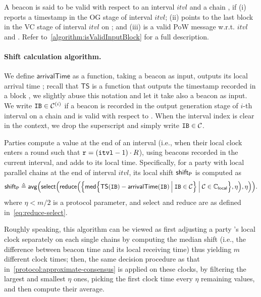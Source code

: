 A beacon  is said to be valid with respect to an interval $itvl$ and a chain \chain, if (i)  reports a timestamp in the \textsf{OG} stage of interval $itvl$; (ii)  points to the last block in the \textsf{VC} stage of interval $itvl$ on \chain; and (iii)  is a valid PoW message w.r.t. $itvl$ and \chain.
%
Refer to~\cref{algorithm:isValidInputBlock} for a full description.

\paragraph{Shift calculation algorithm.}
%
We define $\mathsf{arrivalTime}$ as a function, taking a beacon  as input, outputs its local arrival time \protocolTime{\interval}{\round}; recall that $\mathsf{TS}$ is a function that outputs the timestamp recorded in a block \block, we slightly abuse this notation and let it take also a beacon as input.
%
We write $\mathtt{IB} \in \mathcal{C}^{(i)}$ if a beacon  is recorded in the output generation stage of $i$-th interval on a chain \chain and  is valid with respect to \chain.
%
When the interval index is clear in the context, we drop the superscript and simply write $\mathtt{IB} \in \mathcal{C}$.

Parties compute a value \shift at the end of an interval (i.e., when their local clock enters a round such that $\mathtt{r} = (\mathtt{itvl} - 1) \cdot R$), using beacons recorded in the current interval, and adds \shift to its local time.
%
Specifically, for a party \party with local parallel chains \parallelChainsLocal at the end of interval $itvl$, its local shift $\mathsf{shift}_\mathsf{P}$ is computed as
%
\begin{equation} \label{eq:sync-shift}
    \mathsf{shift}_\mathsf{P}
    \triangleq
    \mathsf{avg} \Big( \mathsf{select} \Big( \mathsf{reduce} \Big( \Big\{ \mathsf{med} \Big\{ \mathsf{TS}(\mathtt{IB}) - \mathsf{arrivalTime}(\mathtt{IB}) \mathbin\Big| \mathtt{IB} \in \mathcal{C} \Big\} \mathbin\Big| \mathcal{C} \in \mathbb{C}_{\mathsf{local}} \Big\}, \eta \Big), \eta \Big) \Big).
\end{equation}
%
where $\eta < m / 2$ is a protocol parameter, and \textsf{select} and \textsf{reduce} are as defined in~\cref{eq:reduce-select}.

Roughly speaking, this algorithm can be viewed as first adjusting a party \party's local clock separately on each single chains by computing the median shift (i.e., the difference between beacon time and its local receiving time) thus yielding $m$ different clock times; then, the same decision procedure as that in~\cref{protocol:approximate-consensus} is applied on these clocks, by filtering the largest and smallest $\eta$ ones, picking the first clock time every $\eta$ remaining values, and then compute their average.

